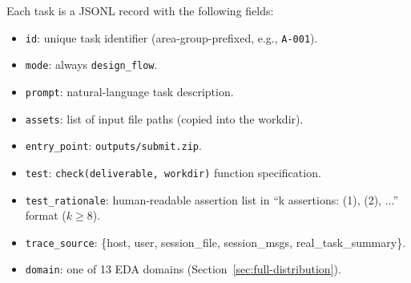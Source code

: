 Each task is a JSONL record with the following fields:
\begin{itemize}
    \item \texttt{id}: unique task identifier (area-group-prefixed, e.g., \texttt{A-001}).
    \item \texttt{mode}: always \texttt{design\_flow}.
    \item \texttt{prompt}: natural-language task description.
    \item \texttt{assets}: list of input file paths (copied into the workdir).
    \item \texttt{entry\_point}: \texttt{outputs/submit.zip}.
    \item \texttt{test}: \texttt{check(deliverable, workdir)} function specification.
    \item \texttt{test\_rationale}: human-readable assertion list in ``k assertions: (1), (2), ...'' format ($k \geq 8$).
    \item \texttt{trace\_source}: \{host, user, session\_file, session\_msgs, real\_task\_summary\}.
    \item \texttt{domain}: one of 13 EDA domains (Section~\ref{sec:full-distribution}).
\end{itemize}
